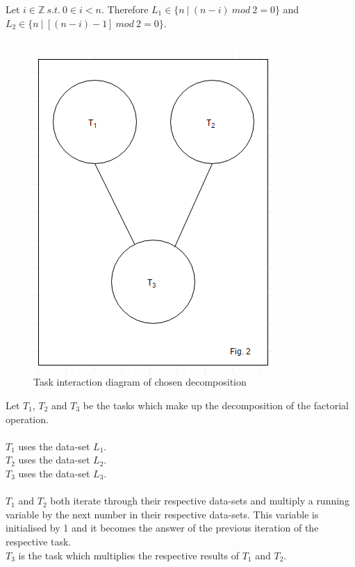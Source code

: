 \documentclass[11pt]{article}
\begin{document}
\begin{page}
\noindent Let $i \in \mathbb{Z} \ s.t. \ 0 \in i < n$.
Therefore $L_1 \in \{ n\ |\ (n - i)\ mod \ 2 = 0 \}$ and $L_2 \in \{ n\ |\ [(n - i) - 1]\ mod \ 2 = 0 \}$.\\\\


\begin{figure}
\centering
     \includegraphics[scale=0.75]{parallel_fig2}\\
     Task interaction diagram of chosen decomposition
\end{figure}
\noindent Let $T_1$, $T_2$ and $T_3$ be the tasks which make up the decomposition of the factorial operation.\\
\\
\noindent $T_1$ uses the data-set $L_1$.\\
\noindent $T_2$ uses the data-set $L_2$.\\
\noindent $T_3$ uses the data-set $L_3$.\\
\\
\noindent $T_1$ and $T_2$ both iterate through their respective data-sets and multiply a running variable by the next number in their respective data-sets.
This variable is initialised by 1 and it becomes the answer of the previous iteration of the respective task. \\
\noindent $T_3$ is the task which multiplies the respective results of $T_1$ and $T_2$.\\\\



\end{page}
\end{document}
